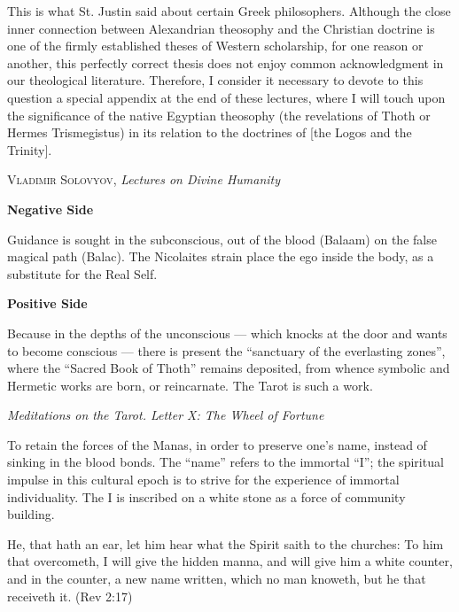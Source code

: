 \begin{quotationx}
This is what St. Justin said about certain Greek philosophers. Although the close inner connection between Alexandrian
theosophy and the Christian doctrine is one of the firmly established theses of Western scholarship, for one reason or
another, this perfectly correct thesis does not enjoy common acknowledgment in our theological literature. Therefore, I
consider it necessary to devote to this question a special appendix at the end of these lectures, where I will touch
upon the significance of the native Egyptian theosophy (the revelations of Thoth or Hermes Trismegistus) in its
relation to the doctrines of [the Logos and the Trinity]. \begin{flushright} \textsc{Vladimir Solovyov}, \emph{Lectures on Divine
Humanity}\end{flushright}

\end{quotationx}
\textbf{Negative Side}

Guidance is sought in the subconscious, out of the blood (Balaam) on the false magical path (Balac). The Nicolaites
strain place the ego inside the body, as a substitute for the Real Self.

\textbf{Positive Side}

\begin{quotationx}
Because in the depths of the unconscious — which knocks at the door and wants to become conscious
— there is present the “sanctuary of the everlasting zones”, where the “Sacred Book of Thoth”
remains deposited, from whence symbolic and Hermetic works are born, or reincarnate. The Tarot is such a work. \begin{flushright}
\emph{Meditations on the Tarot. Letter X: The Wheel of Fortune}\end{flushright}

\end{quotationx}
To retain the forces of the Manas, in order to preserve one's name, instead of sinking in the blood
bonds. The “name” refers to the immortal “I”; the spiritual impulse in this cultural epoch is to strive for the
experience of immortal individuality. The I is inscribed on a white stone as a force of community building.

He, that hath an ear, let him hear what the Spirit saith to the churches: To him that overcometh, I will give the hidden
manna, and will give him a white counter, and in the counter, a new name written, which no man knoweth, but he that
receiveth it. (Rev 2:17)

